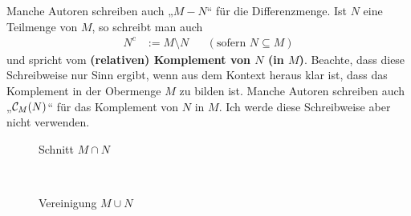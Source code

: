 \begin{defin}
\begin{itemize}
        Manche Autoren schreiben auch „$M-N$“ für die Differenzmenge. Ist $N$ eine Teilmenge von $M$, so schreibt man auch
        \begin{align*}
            N^c & := M\setminus N && (\text{sofern $N\subseteq M$})
        \end{align*}
        und spricht vom \textbf{(relativen) Komplement von $N$ (in $M$)}. Beachte, dass diese Schreibweise nur Sinn ergibt, wenn aus dem Kontext heraus klar ist, dass das Komplement in der Obermenge $M$ zu bilden ist. Manche Autoren schreiben auch „$\mathcal C_M(N)$“ für das Komplement von $N$ in $M$. Ich werde diese Schreibweise aber nicht verwenden.
	\end{itemize}
    \begin{figure}[ht]
        \begin{minipage}{.48\textwidth}
            \centering
            \caption{Schnitt $M\cap N$}
        \end{minipage}
        \quad
        \begin{minipage}{.48\textwidth}
            \centering
            \caption{Vereinigung $M\cup N$}
        \end{minipage}
        \quad\\[1em]
        \begin{minipage}{.48\textwidth}
            \centering
\end{minipage}
\end{figure}
\end{defin}
